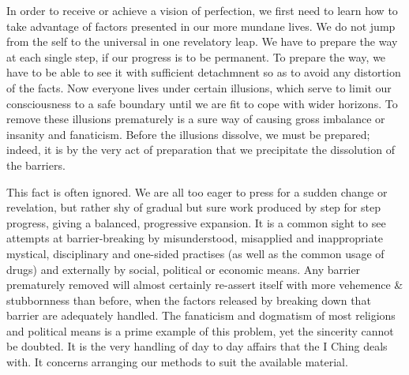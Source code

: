 \documentclass[11pt]{book}
\begin{document}
In order to receive or achieve a vision of perfection, we first need to learn how to take advantage of factors presented in our more mundane lives. We do not jump from the self to the universal in one revelatory leap. We have to prepare the way at each single step, if our progress is to be permanent. To prepare the way, we have to be able to see it with sufficient detachmnent so as to avoid any distortion of the facts. Now everyone lives under certain illusions, which serve to limit our consciousness to a safe boundary until we are fit to cope with wider horizons. To remove these illusions prematurely is a sure way of causing gross imbalance or insanity and fanaticism. Before the illusions dissolve, we must be prepared; indeed, it is by the very act of preparation that we precipitate the dissolution of the barriers.

This fact is often ignored. We are all too eager to press for a sudden change or revelation, but rather shy of gradual but sure work produced by step for step progress, giving a balanced, progressive expansion. It is a common sight to see attempts at barrier-breaking by misunderstood, misapplied and inappropriate mystical, disciplinary and one-sided practises (as well as the common usage of drugs) and externally by social, political or economic means. Any barrier prematurely removed will almost certainly re-assert itself with more vehemence \& stubbornness than before, when the factors released by breaking down that barrier are adequately handled. The fanaticism and dogmatism of most religions and political means is a prime example of this problem, yet the sincerity cannot be doubted. It is the very handling of day to day affairs that the I Ching deals with. It concerns arranging our methods to suit the available material.
\end{document}
